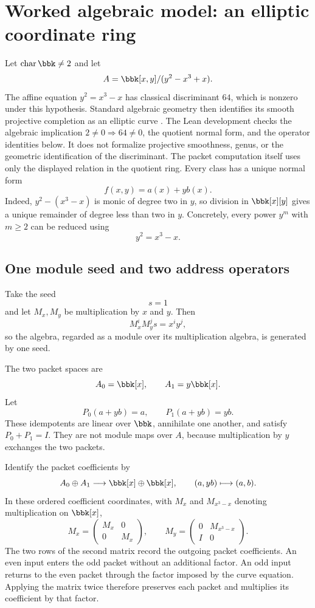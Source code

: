 \section{Worked algebraic model: an elliptic coordinate ring}

Let $\operatorname{char}\bbk\ne2$ and let
\[
A=\bbk[x,y]/(y^2-x^3+x).
\]
The affine equation $y^2=x^3-x$ has classical discriminant $64$, which is nonzero under this hypothesis. Standard algebraic geometry then identifies its smooth projective completion as an elliptic curve \cite{silverman2009}. The Lean development checks the algebraic implication $2\ne0\Rightarrow64\ne0$, the quotient normal form, and the operator identities below. It does not formalize projective smoothness, genus, or the geometric identification of the discriminant. The packet computation itself uses only the displayed relation in the quotient ring.
Every class has a unique normal form
\[
f(x,y)=a(x)+y b(x).
\]
Indeed, $y^2-(x^3-x)$ is monic of degree two in $y$, so division in $\bbk[x][y]$ gives a unique remainder of degree less than two in $y$. Concretely, every power $y^m$ with $m\ge2$ can be reduced using
\[
y^2=x^3-x.
\]

\subsection{One module seed and two address operators}

Take the seed
\[
s=1
\]
and let $M_x,M_y$ be multiplication by $x$ and $y$. Then
\[
M_x^iM_y^js=x^iy^j,
\]
so the algebra, regarded as a module over its multiplication algebra, is generated by one seed.

The two packet spaces are
\[
A_0=\bbk[x],
\qquad
A_1=y\bbk[x].
\]
Let
\[
P_0(a+yb)=a,
\qquad
P_1(a+yb)=yb.
\]
These idempotents are linear over $\bbk$, annihilate one another, and satisfy $P_0+P_1=I$. They are not module maps over $A$, because multiplication by $y$ exchanges the two packets.

Identify the packet coefficients by
\[
A_0\oplus A_1\longrightarrow\bbk[x]\oplus\bbk[x],
\qquad
(a,yb)\longmapsto(a,b).
\]
In these ordered coefficient coordinates, with $M_x$ and $M_{x^3-x}$ denoting multiplication on $\bbk[x]$,
\[
{
M_x=
\begin{pmatrix}
M_x&0\\
0&M_x
\end{pmatrix},
\qquad
M_y=
\begin{pmatrix}
0&M_{x^3-x}\\
I&0
\end{pmatrix}.
}
\]
The two rows of the second matrix record the outgoing packet coefficients. An even input enters the odd packet without an additional factor. An odd input returns to the even packet through the factor imposed by the curve equation. Applying the matrix twice therefore preserves each packet and multiplies its coefficient by that factor.

